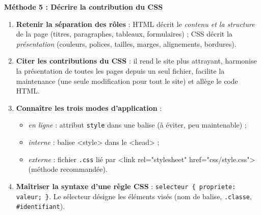 \documentclass[11pt]{article}
\newcommand{\cle}[1]{{\popxbold\color{popdark}#1}}
\begin{document}
\textbf{Méthode 5 : Décrire la contribution du CSS}\par
\begin{methode}
\begin{enumerate}
\item \textbf{Retenir la séparation des rôles} : HTML décrit le \emph{contenu et la structure} de la page (titres, paragraphes, tableaux, formulaires) ; CSS décrit la \emph{présentation} (couleurs, polices, tailles, marges, alignements, bordures).
\item \textbf{Citer les contributions du CSS} : il rend le site plus attrayant, harmonise la présentation de toutes les pages depuis un seul fichier, facilite la maintenance (une seule modification pour tout le site) et allège le code HTML.
\item \textbf{Connaître les trois modes d'application} :
\begin{itemize}
\item \emph{en ligne} : attribut \texttt{style} dans une balise (à éviter, peu maintenable) ;
\item \emph{interne} : balise \cle{<style>} dans le \cle{<head>} ;
\item \emph{externe} : fichier \texttt{.css} lié par \cle{<link rel="stylesheet" href="css/style.css">} (méthode recommandée).
\end{itemize}
\item \textbf{Maîtriser la syntaxe d'une règle CSS} : \texttt{selecteur \{ propriete: valeur; \}}. Le sélecteur désigne les éléments visés (nom de balise, \texttt{.classe}, \texttt{\#identifiant}).
\end{enumerate}
\end{methode}
\end{document}
